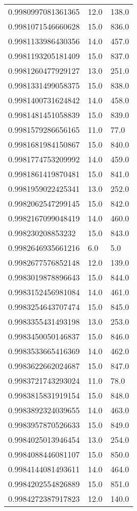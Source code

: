 \begin{center}
\begin{supertabular}[H]{p{0.30\textwidth}p{0.05\textwidth}p{0.05\textwidth}}
0.9980997081361365 & 12.0 & 138.0 \\ 
0.9981071546660628 & 15.0 & 836.0 \\ 
0.9981133986430356 & 14.0 & 457.0 \\ 
0.9981193205181409 & 15.0 & 837.0 \\ 
0.9981260477929127 & 13.0 & 251.0 \\ 
0.9981331499058375 & 15.0 & 838.0 \\ 
0.9981400731624842 & 14.0 & 458.0 \\ 
0.9981481451058839 & 15.0 & 839.0 \\ 
0.9981579286656165 & 11.0 & 77.0 \\ 
0.9981681984150867 & 15.0 & 840.0 \\ 
0.9981774753209992 & 14.0 & 459.0 \\ 
0.9981861419870481 & 15.0 & 841.0 \\ 
0.9981959022425341 & 13.0 & 252.0 \\ 
0.9982062547299145 & 15.0 & 842.0 \\ 
0.9982167099048419 & 14.0 & 460.0 \\ 
0.998230208853232 & 15.0 & 843.0 \\ 
0.9982646935661216 & 6.0 & 5.0 \\ 
0.9982677576852148 & 12.0 & 139.0 \\ 
0.9983019878896643 & 15.0 & 844.0 \\ 
0.9983152456981084 & 14.0 & 461.0 \\ 
0.9983254643707474 & 15.0 & 845.0 \\ 
0.9983355431493198 & 13.0 & 253.0 \\ 
0.9983450050146837 & 15.0 & 846.0 \\ 
0.9983533665416369 & 14.0 & 462.0 \\ 
0.9983622662024687 & 15.0 & 847.0 \\ 
0.9983721743293024 & 11.0 & 78.0 \\ 
0.9983815831919154 & 15.0 & 848.0 \\ 
0.9983892324039655 & 14.0 & 463.0 \\ 
0.9983957870526633 & 15.0 & 849.0 \\ 
0.9984025013946454 & 13.0 & 254.0 \\ 
0.9984088446081107 & 15.0 & 850.0 \\ 
0.9984144081493611 & 14.0 & 464.0 \\ 
0.9984202554826889 & 15.0 & 851.0 \\ 
0.9984272387917823 & 12.0 & 140.0 \\ 

\end{supertabular}
\end{center}
